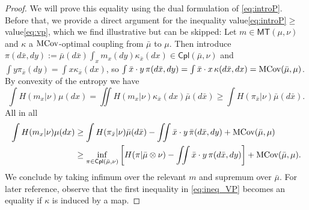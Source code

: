 \documentclass[reqno, a4paper]{amsart}
\theoremstyle{plain}
\theoremstyle{definition}
\theoremstyle{remark}
\numberwithin{equation}{section}
\numberwithin{theorem}{section}
\newcommand{\MT}{\mathsf{MT}}
\newcommand{\Cpl}{\mathsf{Cpl}}
\newcommand{\MCov}{\textnormal{MCov}}
\begin{document}
	
	
	\begin{proof}
		We will prove this equality using the dual formulation of \eqref{eq:introP}. Before that, we provide a direct argument for the inequality value\eqref{eq:introP}$\geq $ value\eqref{eq:vp}, which we find illustrative but can be skipped: 
		Let $m\in \MT(\mu,\nu)$ and $\kappa$ a $\MCov$-optimal coupling from $\bar \mu$ to $\mu$. Then introduce $\pi(d\bar x,dy):=\bar\mu(d\bar x)\int_x m_x(dy)\kappa_{\bar x}(dx)\in\Cpl(\bar\mu,\nu)$ and $\int y\pi_{\bar x}(dy)=\int x \kappa_{\bar x}(dx)$, so $\int \bar x\cdot y \,\pi(d\bar x,dy)=\int \bar x\cdot x\, \kappa(d\bar x,dx)=\MCov(\bar\mu,\mu)$. By convexity of the entropy we have
		$$ \int H(m_x|\nu)\mu(dx) = \iint H(m_x|\nu)\kappa_{\bar x}(dx)\bar\mu(d\bar x)   \geq \int H( \pi_{\bar x}|\nu)\bar\mu(d\bar x).$$ All in all
		\begin{align} \notag
			\int H(m_x|\nu)\mu(dx) & \geq \int H( \pi_{\bar x}|\nu)\bar\mu(d\bar x)-\iint \bar x\cdot y\, \bar\pi(d\bar x,dy)+\MCov(\bar\mu,\mu) \\ & \geq \inf_{\pi\in \Cpl(\bar\mu,\nu) }\left[H(\pi|\bar\mu\otimes \nu) - \iint \bar x\cdot y \,\pi(d\bar x,dy)\right]   + \MCov(\bar\mu,\mu). \label{eq:ineq_VP}
		\end{align}
		We conclude by taking infimum over the relevant $m$ and supremum over $\bar\mu$. For later reference, observe that the first inequality in \eqref{eq:ineq_VP} becomes an equality if $\kappa$ is induced by a map.
		

\end{proof}
\end{document}
